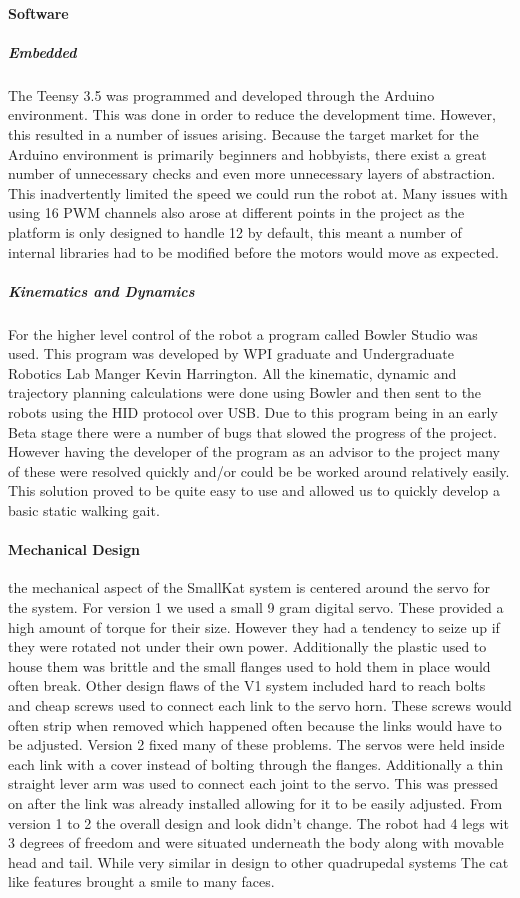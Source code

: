     \paragraph{Software}
    \subparagraph*{Embedded}
    The Teensy 3.5 was programmed and developed through the Arduino environment. This was done in order to reduce the development time. However, this resulted in a number of issues arising. Because the target market for the Arduino environment is primarily beginners and hobbyists, there exist a great number of unnecessary checks and even more unnecessary layers of abstraction. This inadvertently limited the speed we could run the robot at. Many issues with using 16 PWM channels also arose at different points in the project as the platform is only designed to handle 12 by default, this meant a number of internal libraries had to be modified before the motors would move as expected. 
    \subparagraph*{Kinematics and Dynamics}
    For the higher level control of the robot a program called Bowler Studio was used. This program was developed by WPI graduate and Undergraduate Robotics Lab Manger Kevin Harrington. All the kinematic, dynamic and trajectory planning calculations were done using Bowler and then sent to the robots using the HID protocol over USB. Due to this program being in an early Beta stage there were a number of bugs that slowed the progress of the project. However having the developer of the program as an advisor to the project many of these were resolved quickly and/or could be be worked around relatively easily. This solution proved to be quite easy to use and allowed us to quickly develop a basic static walking gait. 
    \paragraph{Mechanical Design}
    the mechanical aspect of the SmallKat system is centered around the servo for the system. For version 1 we used a small 9 gram digital servo. These provided a high amount of torque for their size. However they had a tendency to seize up if they were rotated not under their own power. Additionally the plastic used to house them was brittle and the small flanges used to hold them in place would often break. Other design flaws of the V1 system included hard to reach bolts and cheap screws used to connect each link to the servo horn. These screws would often strip when removed which happened often because the links would have to be adjusted. Version 2 fixed many of these problems. The servos were held inside each link with a cover instead of bolting through the flanges. Additionally a thin straight lever arm was used to connect each joint to the servo. This was pressed on after the link was already installed allowing for it to be easily adjusted. From version 1 to 2 the overall design and look didn't change. The robot had 4 legs wit 3 degrees of freedom and were situated underneath the body along with movable head and tail. While very similar in design to other quadrupedal systems The cat like features brought a smile to many faces.
